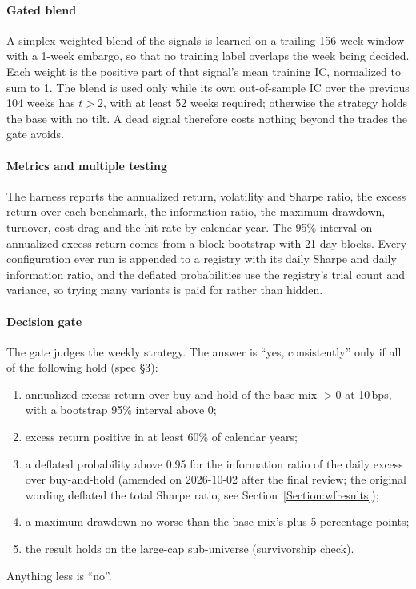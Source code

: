 \documentclass[preprint,3p,twocolumn]{elsarticle}
\begin{document}
\paragraph{Gated blend} A simplex-weighted blend of the signals is learned on a trailing 156-week window with a 1-week embargo, so that no training label overlaps the week being decided. Each weight is the positive part of that signal's mean training IC, normalized to sum to 1. The blend is used only while its own out-of-sample IC over the previous 104 weeks has $t>2$, with at least 52 weeks required; otherwise the strategy holds the base with no tilt. A dead signal therefore costs nothing beyond the trades the gate avoids.

\paragraph{Metrics and multiple testing} The harness reports the annualized return, volatility and Sharpe ratio, the excess return over each benchmark, the information ratio, the maximum drawdown, turnover, cost drag and the hit rate by calendar year. The 95\% interval on annualized excess return comes from a block bootstrap with 21-day blocks. Every configuration ever run is appended to a registry with its daily Sharpe and daily information ratio, and the deflated probabilities use the registry's trial count and variance, so trying many variants is paid for rather than hidden.

\paragraph{Decision gate} The gate judges the weekly strategy. The answer is ``yes, consistently'' only if all of the following hold (spec \S3):
\begin{enumerate}
\item annualized excess return over buy-and-hold of the base mix $>0$ at 10\,bps, with a bootstrap 95\% interval above 0;
\item excess return positive in at least 60\% of calendar years;
\item a deflated probability above 0.95 for the information ratio of the daily excess over buy-and-hold (amended on 2026-10-02 after the final review; the original wording deflated the total Sharpe ratio, see Section~\ref{Section:wfresults});
\item a maximum drawdown no worse than the base mix's plus 5 percentage points;
\item the result holds on the large-cap sub-universe (survivorship check).
\end{enumerate}
Anything less is ``no''.
\end{document}
